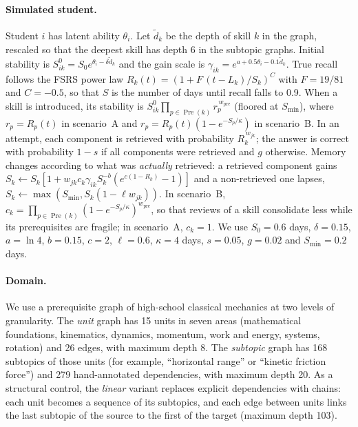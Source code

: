 \documentclass[runningheads]{llncs}
\newcommand{\Pre}{\operatorname{Pre}}
\newcommand{\Smin}{S_{\min}}
\begin{document}
\paragraph{Simulated student.} Student $i$ has latent ability $\theta_i$. Let $\tilde d_k$ be the depth of skill $k$ in the graph, rescaled so that the deepest skill has depth 6 in the subtopic graphs. Initial stability is $S^0_{ik}=S_0e^{\theta_i-\delta\tilde d_k}$ and the gain scale is $\gamma_{ik}=e^{a+0.5\theta_i-0.1\tilde d_k}$. True recall follows the FSRS power law $R_k(t)=(1+F\,(t-L_k)/S_k)^{C}$ with $F=19/81$ and $C=-0.5$, so that $S$ is the number of days until recall falls to 0.9. When a skill is introduced, its stability is $S^0_{ik}\prod_{p\in\Pre(k)}r_p^{\,w_{\mathrm{pre}}}$ (floored at $\Smin$), where $r_p=R_p(t)$ in scenario~A and $r_p=R_p(t)(1-e^{-S_p/\kappa})$ in scenario~B. In an attempt, each component is retrieved with probability $R_k^{\,w_{jk}}$; the answer is correct with probability $1-s$ if all components were retrieved and $g$ otherwise. Memory changes according to what was \emph{actually} retrieved: a retrieved component gains $S_k\leftarrow S_k[1+w_{jk}c_k\gamma_{ik}S_k^{-b}(e^{c(1-R_k)}-1)]$ and a non-retrieved one lapses, $S_k\leftarrow\max(\Smin,S_k(1-\ell w_{jk}))$. In scenario~B, $c_k=\prod_{p\in\Pre(k)}(1-e^{-S_p/\kappa})^{w_{\mathrm{pre}}}$, so that reviews of a skill consolidate less while its prerequisites are fragile; in scenario~A, $c_k=1$. We use $S_0=0.6$ days, $\delta=0.15$, $a=\ln4$, $b=0.15$, $c=2$, $\ell=0.6$, $\kappa=4$ days, $s=0.05$, $g=0.02$ and $\Smin=0.2$ days.

\paragraph{Domain.} We use a prerequisite graph of high-school classical mechanics at two levels of granularity. The \emph{unit} graph has 15 units in seven areas (mathematical foundations, kinematics, dynamics, momentum, work and energy, systems, rotation) and 26 edges, with maximum depth 8. The \emph{subtopic} graph has 168 subtopics of those units (for example, ``horizontal range'' or ``kinetic friction force'') and 279 hand-annotated dependencies, with maximum depth 20. As a structural control, the \emph{linear} variant replaces explicit dependencies with chains: each unit becomes a sequence of its subtopics, and each edge between units links the last subtopic of the source to the first of the target (maximum depth 103).
\end{document}
